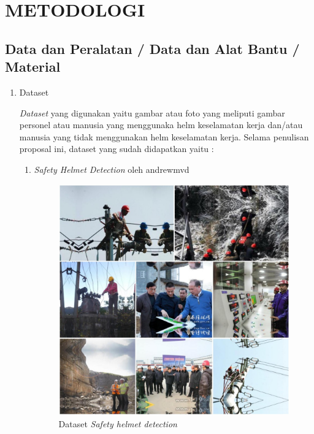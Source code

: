 \section{METODOLOGI}
\label{chap:desainimplementasi}



\subsection{Data dan Peralatan / Data dan Alat Bantu / Material}
\label{sec:perlengkapan}


\begin{enumerate}
  \item Dataset
  \par \emph{Dataset} yang digunakan yaitu gambar atau foto yang meliputi gambar personel atau manusia yang menggunaka helm keselamatan kerja dan/atau manusia yang tidak menggunakan helm keselamatan kerja.
  Selama penulisan proposal ini, dataset yang sudah didapatkan yaitu :
  \begin{enumerate}
    \item \emph{Safety Helmet Detection} oleh andrewmvd

    \begin{figure}[ht]
      \centering
      \includegraphics[scale=0.3]{gambar/safetyhelemtdataset_andrewmvd.png}
      \caption{Dataset \emph{Safety helmet detection}}
      \label{fig:safetyhelemtdataset}  
    \end{figure}


\end{enumerate}
\end{enumerate}
